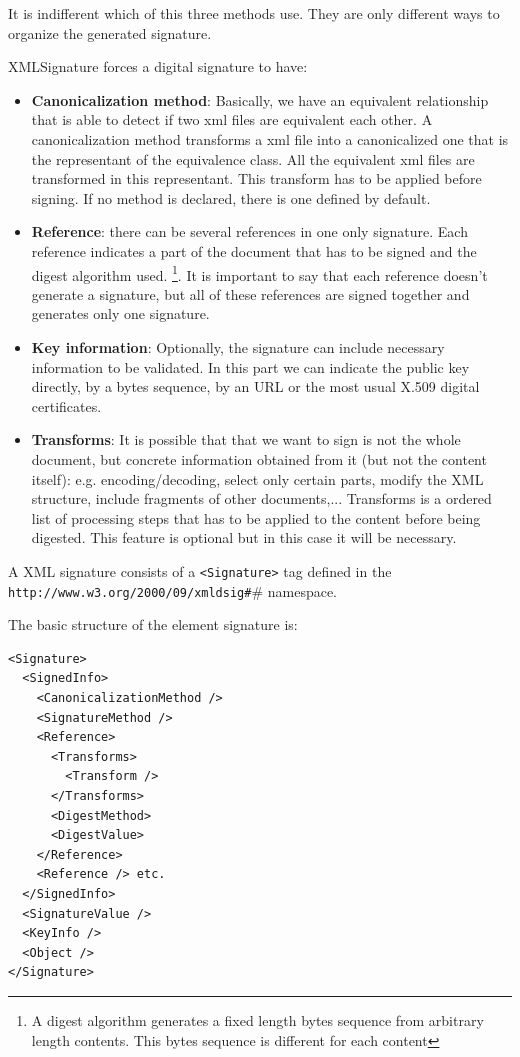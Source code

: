 It is indifferent which of this three methods use. They are only different
ways to organize the generated signature. 

XMLSignature forces a digital signature to have:
\begin{itemize}
\item \textbf{Canonicalization method}: Basically, we have an equivalent relationship
that is able to detect if two xml files are equivalent each other. A canonicalization method transforms a xml file into a canonicalized one that is the representant
of the equivalence class. All the equivalent xml files are transformed
in this representant. This transform has to be applied before signing. If no method is declared, there is one defined by default.
\item \textbf{Reference}: there can be several references in one only signature.
Each reference indicates a part of the document that has to be signed and
the digest algorithm used. \footnote{A digest algorithm generates a fixed length
bytes sequence from arbitrary length contents. This bytes sequence is different
for each content}. It is important to say that each reference doesn't generate
a signature, but all of these references are signed together and generates only
one signature.
\item \textbf{Key information}: Optionally, the signature can include necessary
information to be validated. In this part we can indicate the public key
directly, by a bytes sequence, by an URL or the most usual X.509 digital certificates.\item \textbf{Transforms}: It is possible that that we want to sign is not
the whole document, but concrete information obtained from it (but not the
content itself): e.g. encoding/decoding, select only certain parts, modify the XML structure,
include fragments of other documents,... Transforms is a ordered list of
processing steps that has to be applied to the content before being digested.  This feature is optional but in this case it will be necessary.
\end{itemize}

A XML signature consists of a \texttt{<Signature>}
tag defined in the \texttt{http://www.w3.org/2000/09/xmldsig\#}# namespace.

The basic structure of the element signature is:

\begin{lstlisting}
<Signature>
  <SignedInfo>
    <CanonicalizationMethod />
    <SignatureMethod />
    <Reference>
      <Transforms>
        <Transform />
      </Transforms> 
      <DigestMethod>
      <DigestValue>
    </Reference>
    <Reference /> etc.
  </SignedInfo>
  <SignatureValue />
  <KeyInfo />
  <Object />
</Signature>
\end{lstlisting}

